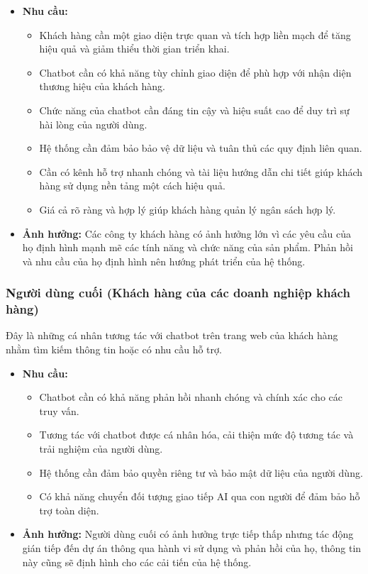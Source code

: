 \begin{itemize}
    \item \textbf{Nhu cầu:}
    \begin{itemize}
        \item Khách hàng cần một giao diện trực quan và tích hợp liền mạch để tăng hiệu quả và giảm thiểu thời gian triển khai.
        \item Chatbot cần có khả năng tùy chỉnh giao diện để phù hợp với nhận diện thương hiệu của khách hàng.
        \item Chức năng của chatbot cần đáng tin cậy và hiệu suất cao để duy trì sự hài lòng của người dùng.
        \item Hệ thống cần đảm bảo bảo vệ dữ liệu và tuân thủ các quy định liên quan.
        \item Cần có kênh hỗ trợ nhanh chóng và tài liệu hướng dẫn chi tiết giúp khách hàng sử dụng nền tảng một cách hiệu quả.
        \item Giá cả rõ ràng và hợp lý giúp khách hàng quản lý ngân sách hợp lý.
    \end{itemize}
    \item \textbf{Ảnh hưởng:} Các công ty khách hàng có ảnh hưởng lớn vì các yêu cầu của họ định hình mạnh mẽ các tính năng và chức năng của sản phẩm. Phản hồi và nhu cầu của họ định hình nên hướng phát triển của hệ thống.
\end{itemize}

\subsubsection{Người dùng cuối (Khách hàng của các doanh nghiệp khách hàng)}

Đây là những cá nhân tương tác với chatbot trên trang web của khách hàng nhằm tìm kiếm thông tin hoặc có nhu cầu hỗ trợ.

\begin{itemize}
    \item \textbf{Nhu cầu:}
    \begin{itemize}
        \item Chatbot cần có khả năng phản hồi nhanh chóng và chính xác cho các truy vấn.
        \item Tương tác với chatbot được cá nhân hóa, cải thiện mức độ tương tác và trải nghiệm của người dùng.
        \item Hệ thống cần đảm bảo quyền riêng tư và bảo mật dữ liệu của người dùng.
        \item Có khả năng chuyển đối tượng giao tiếp AI qua con người để đảm bảo hỗ trợ toàn diện.
    \end{itemize}
    \item \textbf{Ảnh hưởng:} Người dùng cuối có ảnh hưởng trực tiếp thấp nhưng tác động gián tiếp đến dự án thông qua hành vi sử dụng và phản hồi của họ, thông tin này cũng sẽ định hình cho các cải tiến của hệ thống.
\end{itemize}

